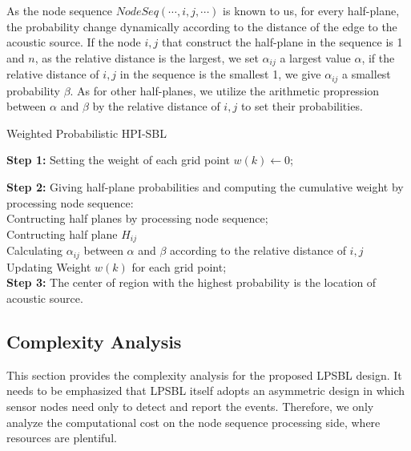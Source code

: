 As the node sequence $NodeSeq( \cdots ,i,j, \cdots )$ is known to us, for every half-plane, the probability change dynamically according to the distance of the edge to the acoustic source. If the node $i,j$ that construct the half-plane in the sequence is 1 and $n$, as the relative distance is the largest, we set $\alpha_{ij}$ a largest value $\alpha$, if the relative distance of $i,j$ in the sequence is the smallest 1, we give $\alpha_{ij}$ a smallest probability $\beta$. As for other half-planes, we utilize the arithmetic propression between $\alpha$ and $\beta$ by the relative distance of $i,j$ to set their probabilities.
 \begin{algorithm}
 	\caption{Weighted Probabilistic HPI-SBL}
 	
 	\textbf{Step 1:} Setting the weight of each grid point  $w(k) \leftarrow 0$;
 	
 	\textbf{Step 2:} Giving half-plane probabilities and computing the cumulative weight by processing node sequence: \\ 
 	\hspace{0.0in} Contructing half planes by processing node sequence;\\
 	{
 		{
 			Contructing half plane $H_{ij}$\\
 			Calculating $\alpha_{ij}$ between $\alpha$ and $\beta$ according to the relative distance of $i,j$\\
 			Updating Weight $w(k)$ for each grid point;\\
 		}
 	}
 	\textbf{Step 3:} The center of region with the highest probability is the location of acoustic source.
 \end{algorithm}

\iffalse
 \subsection{Complexity Analysis}
 This section provides the complexity analysis for the proposed
 LPSBL design. It needs to be emphasized that
 LPSBL itself adopts an asymmetric design in which sensor
 nodes need only to detect and report the events. Therefore,
 we only analyze the computational cost on the node sequence
 processing side, where resources are plentiful.

